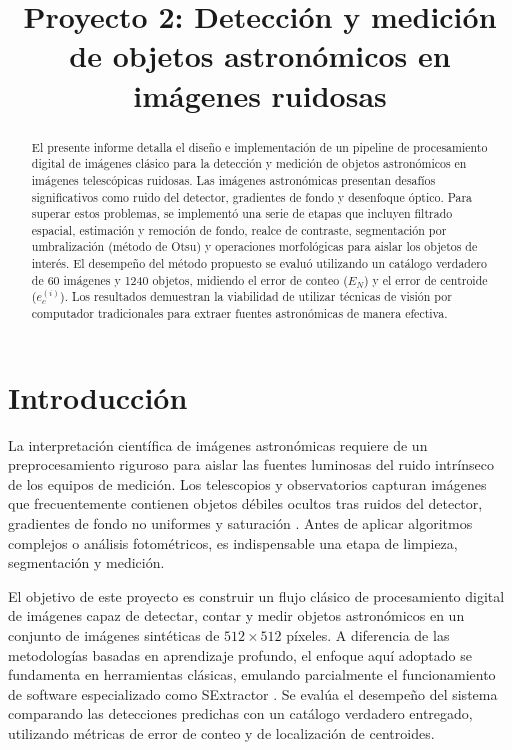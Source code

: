 \documentclass[conference]{IEEEtran}
\title{Proyecto 2: Detección y medición de objetos astronómicos en imágenes ruidosas}
\author{\IEEEauthorblockN{Camilo Andrés Ladino Morales}
\IEEEauthorblockA{EIE401 - Procesamiento Digital Multimedia\\
Pontificia Universidad Católica de Valparaíso\\
Profesor: Jorge Cárdenas}
}
\begin{document}
\maketitle

\begin{abstract}
El presente informe detalla el diseño e implementación de un pipeline de procesamiento digital de imágenes clásico para la detección y medición de objetos astronómicos en imágenes telescópicas ruidosas. Las imágenes astronómicas presentan desafíos significativos como ruido del detector, gradientes de fondo y desenfoque óptico. Para superar estos problemas, se implementó una serie de etapas que incluyen filtrado espacial, estimación y remoción de fondo, realce de contraste, segmentación por umbralización (método de Otsu) y operaciones morfológicas para aislar los objetos de interés. El desempeño del método propuesto se evaluó utilizando un catálogo verdadero de 60 imágenes y 1240 objetos, midiendo el error de conteo ($E_N$) y el error de centroide ($e_c^{(i)}$). Los resultados demuestran la viabilidad de utilizar técnicas de visión por computador tradicionales para extraer fuentes astronómicas de manera efectiva.
\end{abstract}

\section{Introducción}
La interpretación científica de imágenes astronómicas requiere de un preprocesamiento riguroso para aislar las fuentes luminosas del ruido intrínseco de los equipos de medición. Los telescopios y observatorios capturan imágenes que frecuentemente contienen objetos débiles ocultos tras ruidos del detector, gradientes de fondo no uniformes y saturación \cite{sextractor}. Antes de aplicar algoritmos complejos o análisis fotométricos, es indispensable una etapa de limpieza, segmentación y medición.

El objetivo de este proyecto es construir un flujo clásico de procesamiento digital de imágenes capaz de detectar, contar y medir objetos astronómicos en un conjunto de imágenes sintéticas de $512\times512$ píxeles. A diferencia de las metodologías basadas en aprendizaje profundo, el enfoque aquí adoptado se fundamenta en herramientas clásicas, emulando parcialmente el funcionamiento de software especializado como SExtractor \cite{sextractor}. Se evalúa el desempeño del sistema comparando las detecciones predichas con un catálogo verdadero entregado, utilizando métricas de error de conteo y de localización de centroides.
\end{document}
